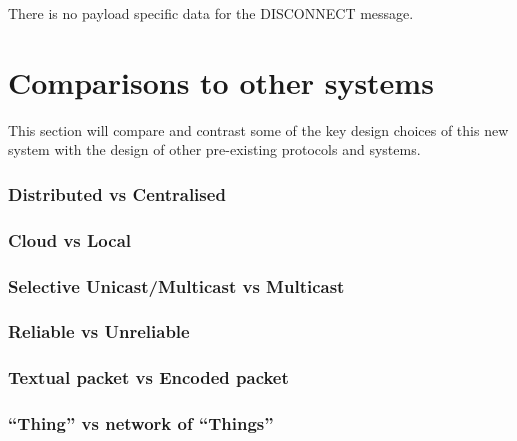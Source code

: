 There is no payload specific data for the DISCONNECT message.





\section{Comparisons to other systems}
This section will compare and contrast some of the key design choices of this new system with the design of other pre-existing protocols and systems. 

\subsubsection{Distributed vs Centralised} %
\label{ssub:distributed_vs_centralised}

\subsubsection{Cloud vs Local} %
\label{ssub:cloud_vs_local}

\subsubsection{Selective Unicast/Multicast vs Multicast} %
\label{ssub:selective_unicast_multicast_vs_multicast}

\subsubsection{Reliable vs Unreliable} %
\label{ssub:reliable_vs_unreliable}


\subsubsection{Textual packet vs Encoded packet} %
\label{ssub:textual_packet_vs_encoded_packet}

\subsubsection{``Thing'' vs network of ``Things''} %
\label{ssub:_thing_vs_network_of_things_}

